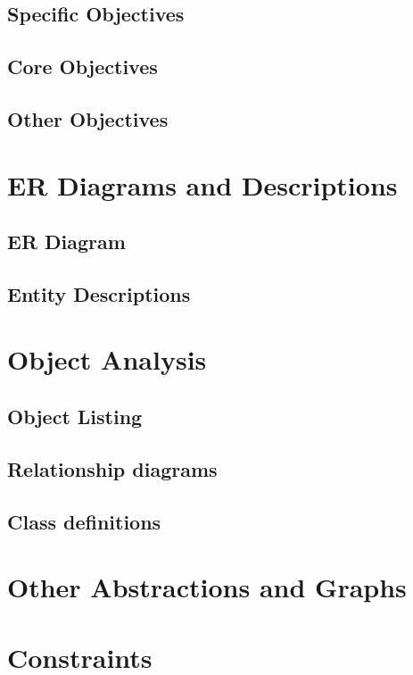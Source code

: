 \subsection{Specific Objectives}

\subsection{Core Objectives}

\subsection{Other Objectives}

\section{ER Diagrams and Descriptions}

\subsection{ER Diagram}

\subsection{Entity Descriptions}

\section{Object Analysis}

\subsection{Object Listing}

\subsection{Relationship diagrams}

\subsection{Class definitions}

\section{Other Abstractions and Graphs}

\section{Constraints}

